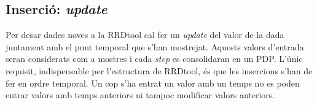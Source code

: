 





\subsection{Inserció: \emph{update}}\label{RRDupdate}

Per desar dades noves a la RRDtool cal fer un \emph{update} del valor de la dada juntament amb el punt temporal que s'han mostrejat. Aquests valors d'entrada seran considerats com a mostres i cada \emph{step} es consolidaran en un PDP. L'únic requisit, indispensable per l'estructura de RRDtool, és que les insercions s'han de fer en ordre temporal. Un cop s'ha entrat un valor amb un temps no es poden entrar valors amb temps anteriors ni tampoc modificar valors anteriors. 

